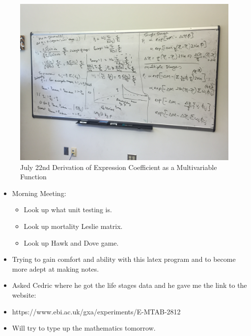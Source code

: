 \documentclass[letterpaper,index=totoc,hyperref,openany]{labbook} %
\begin{document}
\begin{figure}[H]
\begin{center}
\includegraphics[scale=.1]{../Figures/2016/July_22/OmegaDerivation.jpg}
\end{center}
\caption{July 22nd Derivation of Expression Coefficient as a Multivariable Function}
\end{figure}

\begin{itemize}
\item Morning Meeting:
\begin{itemize}
\item Look up what unit testing is.
\item Look up mortality Leslie matrix.
\item Look up Hawk and Dove game.
\end{itemize}
\item Trying to gain comfort and ability with this latex program and to become more adept at making notes.
\item Asked Cedric where he got the life stages data and he gave me the link to the website:
\item https://www.ebi.ac.uk/gxa/experiments/E-MTAB-2812
\item Will try to type up the mathematics tomorrow.
\end{itemize}
\end{document}
